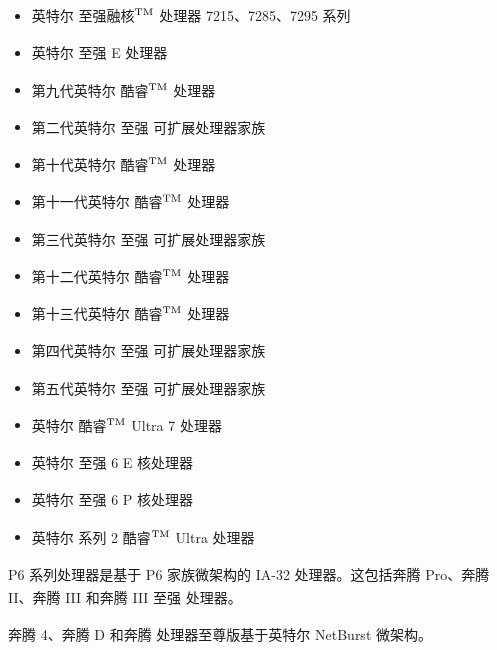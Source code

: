 \documentclass{article}
\begin{document}
\begin{itemize}
\item 英特尔\textsuperscript{\textregistered}  至强融核$^{\rm{TM}}$ 处理器 7215、7285、7295 系列
\item 英特尔\textsuperscript{\textregistered}  至强\textsuperscript{\textregistered}  E 处理器
\item 第九代英特尔\textsuperscript{\textregistered}  酷睿$^{\rm{TM}}$ 处理器
\item 第二代英特尔\textsuperscript{\textregistered}  至强\textsuperscript{\textregistered}  可扩展处理器家族
\item 第十代英特尔\textsuperscript{\textregistered}  酷睿$^{\rm{TM}}$ 处理器
\item 第十一代英特尔\textsuperscript{\textregistered}  酷睿$^{\rm{TM}}$ 处理器
\item 第三代英特尔\textsuperscript{\textregistered}  至强\textsuperscript{\textregistered}  可扩展处理器家族
\item 第十二代英特尔\textsuperscript{\textregistered}  酷睿$^{\rm{TM}}$ 处理器
\item 第十三代英特尔\textsuperscript{\textregistered}  酷睿$^{\rm{TM}}$ 处理器
\item 第四代英特尔\textsuperscript{\textregistered}  至强\textsuperscript{\textregistered}  可扩展处理器家族
\item 第五代英特尔\textsuperscript{\textregistered}  至强\textsuperscript{\textregistered}  可扩展处理器家族
\item 英特尔\textsuperscript{\textregistered}  酷睿$^{\rm{TM}}$ Ultra 7 处理器
\item 英特尔\textsuperscript{\textregistered}  至强\textsuperscript{\textregistered}  6 E 核处理器
\item 英特尔\textsuperscript{\textregistered}  至强\textsuperscript{\textregistered}  6 P 核处理器
\item 英特尔\textsuperscript{\textregistered}  系列 2 酷睿$^{\rm{TM}}$ Ultra 处理器
\end{itemize}

P6 系列处理器是基于 P6 家族微架构的 IA-32 处理器。这包括奔腾\textsuperscript{\textregistered} Pro、奔腾\textsuperscript{\textregistered} II、奔腾\textsuperscript{\textregistered} III 和奔腾\textsuperscript{\textregistered} III 至强\textsuperscript{\textregistered} 处理器。

奔腾\textsuperscript{\textregistered} 4、奔腾\textsuperscript{\textregistered} D 和奔腾\textsuperscript{\textregistered} 处理器至尊版基于英特尔 NetBurst\textsuperscript{\textregistered} 微架构。
\end{document}
